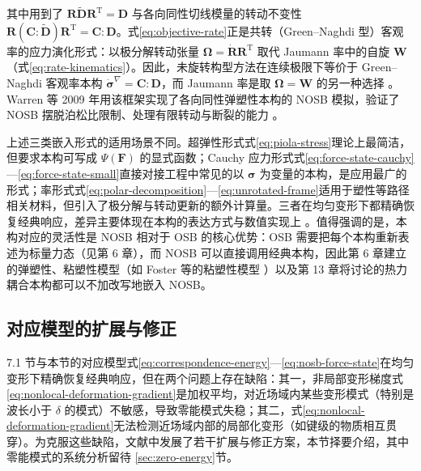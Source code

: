 其中用到了 $\mathbf{R}\tilde{\mathbf{D}}\mathbf{R}^{\mathrm{T}}=\mathbf{D}$ 与各向同性切线模量的转动不变性 $\mathbf{R}(\mathbf{C}:\tilde{\mathbf{D}})\mathbf{R}^{\mathrm{T}}=\mathbf{C}:\mathbf{D}$。式\eqref{eq:objective-rate}正是共转（Green--Naghdi 型）客观率的应力演化形式：以极分解转动张量 $\boldsymbol{\Omega}=\dot{\mathbf{R}}\mathbf{R}^{\mathrm{T}}$ 取代 Jaumann 率中的自旋 $\mathbf{W}$（式\eqref{eq:rate-kinematics}）。因此，未旋转构型方法在连续极限下等价于 Green--Naghdi 客观率本构 $\dot{\boldsymbol{\sigma}}^{\nabla}=\mathbf{C}:\mathbf{D}$，而 Jaumann 率是取 $\boldsymbol{\Omega}=\mathbf{W}$ 的另一种选择 \cite{Warren2009,FlanaganTaylor1987}。Warren 等 2009 年用该框架实现了各向同性弹塑性本构的 NOSB 模拟，验证了 NOSB 摆脱泊松比限制、处理有限转动与断裂的能力 \cite{Warren2009}。

\begin{remark}
  上述三类嵌入形式的适用场景不同。超弹性形式式\eqref{eq:piola-stress}理论上最简洁，但要求本构可写成 $\Psi(\mathbf{F})$ 的显式函数；Cauchy 应力形式式\eqref{eq:force-state-cauchy}—\eqref{eq:force-state-small}直接对接工程中常见的以 $\boldsymbol{\sigma}$ 为变量的本构，是应用最广的形式；率形式式\eqref{eq:polar-decomposition}—\eqref{eq:unrotated-frame}适用于塑性等路径相关材料，但引入了极分解与转动更新的额外计算量。三者在均匀变形下都精确恢复经典响应，差异主要体现在本构的表达方式与数值实现上 \cite{Silling2007,Warren2009,Breitenfeld2014}。值得强调的是，本构对应的灵活性是 NOSB 相对于 OSB 的核心优势：OSB 需要把每个本构重新表述为标量力态（见第 6 章），而 NOSB 可以直接调用经典本构，因此第 6 章建立的弹塑性、粘塑性模型（如 Foster 等的粘塑性模型 \cite{Foster2010}）以及第 13 章将讨论的热力耦合本构都可以不加改写地嵌入 NOSB。
\end{remark}

\subsection{对应模型的扩展与修正}\label{sec:correspondence-extensions}

7.1 节与本节的对应模型式\eqref{eq:correspondence-energy}—\eqref{eq:nosb-force-state}在均匀变形下精确恢复经典响应，但在两个问题上存在缺陷：其一，非局部变形梯度式\eqref{eq:nonlocal-deformation-gradient}是加权平均，对近场域内某些变形模式（特别是波长小于 $\delta$ 的模式）不敏感，导致零能模式失稳；其二，式\eqref{eq:nonlocal-deformation-gradient}无法检测近场域内部的局部化变形（如键级的物质相互贯穿）。为克服这些缺陷，文献中发展了若干扩展与修正方案，本节择要介绍，其中零能模式的系统分析留待 \ref{sec:zero-energy}节。

